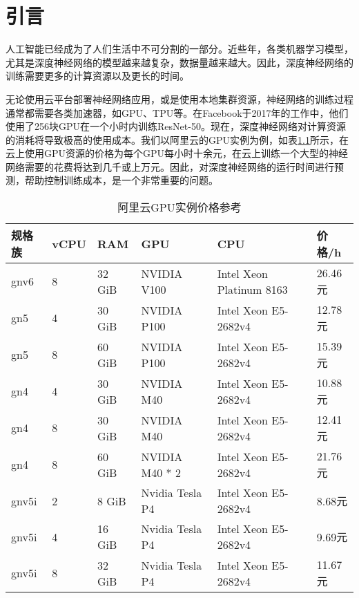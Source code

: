 \chapter{引言}
\label{cha:intro}
    人工智能已经成为了人们生活中不可分割的一部分。近些年，各类机器学习模型，尤其是深度神经网络的模型越来越复杂，数据量越来越大。因此，深度神经网络的训练需要更多的计算资源以及更长的时间。
    
    无论使用云平台部署神经网络应用，或是使用本地集群资源，神经网络的训练过程通常都需要各类加速器，如GPU、TPU等。在Facebook于2017年的工作中，他们使用了256块GPU在一个小时内训练ResNet-50\cite{fb_imagenet}。现在，深度神经网络对计算资源的消耗将导致极高的使用成本。我们以阿里云的GPU实例为例，如表\ref{tab:ali_cloud}所示，在云上使用GPU资源的价格为每个GPU每小时十余元，在云上训练一个大型的神经网络需要的花费将达到几千或上万元。因此，对深度神经网络的运行时间进行预测，帮助控制训练成本，是一个非常重要的问题。
    
    \begin{table}[!htbp]
        \centering
	    \caption{阿里云GPU实例价格参考}
        \label{tab:ali_cloud}
        \begin{tabular}{|l|l|l|l|l|l|}
            \hline
            规格族 & vCPU & RAM & GPU & CPU & 价格/h \\
            \hline
            gnv6 & 8 & 32 GiB & NVIDIA V100 & Intel Xeon Platinum 8163 & 26.46元 \\
            \hline
            gn5 & 4 & 30 GiB & NVIDIA P100 & Intel Xeon E5-2682v4 & 12.78元 \\
            \hline
            gn5 & 8 & 60 GiB & NVIDIA P100 & Intel Xeon E5-2682v4 & 15.39元 \\
            \hline
            gn4 & 4 & 30 GiB & NVIDIA M40 & Intel Xeon E5-2682v4 & 10.88元 \\
            \hline
            gn4 & 8 & 30 GiB & NVIDIA M40 & Intel Xeon E5-2682v4 & 12.41元 \\
            \hline
            gn4 & 8 & 60 GiB & NVIDIA M40 * 2 & Intel Xeon E5-2682v4 & 21.76元 \\
            \hline
            gnv5i & 2 & 8 GiB & Nvidia Tesla P4 & Intel Xeon E5-2682v4 & 8.68元 \\
            \hline
            gnv5i & 4 & 16 GiB & Nvidia Tesla P4 & Intel Xeon E5-2682v4 & 9.69元 \\
            \hline
            gnv5i & 8 & 32 GiB & Nvidia Tesla P4 & Intel Xeon E5-2682v4 & 11.67元 \\
            \hline
        \end{tabular}
    \end{table}

